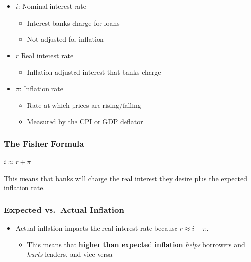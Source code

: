 \documentclass[
  letterpaper,
  DIV=11,
  numbers=noendperiod]{scrartcl}
\providecommand{\tightlist}{%
  \setlength{\itemsep}{0pt}\setlength{\parskip}{0pt}}\usepackage{longtable,booktabs,array}
\begin{document}
\begin{itemize}
\tightlist
\item
  \(i\): Nominal interest rate

  \begin{itemize}
  \tightlist
  \item
    Interest banks charge for loans
  \item
    Not adjusted for inflation
  \end{itemize}
\item
  \(r\) Real interest rate

  \begin{itemize}
  \tightlist
  \item
    Inflation-adjusted interest that banks charge
  \end{itemize}
\item
  \(\pi\): Inflation rate

  \begin{itemize}
  \tightlist
  \item
    Rate at which prices are rising/falling
  \item
    Measured by the CPI or GDP deflator
  \end{itemize}
\end{itemize}

\subsubsection{The Fisher Formula}\label{the-fisher-formula}

\(i \approx r + \pi\)

This means that banks will charge the real interest they desire plus the
expected inflation rate.

\subsubsection{Expected vs.~Actual
Inflation}\label{expected-vs.-actual-inflation}

\begin{itemize}
\tightlist
\item
  Actual inflation impacts the real interest rate because
  \(r \approx i - \pi\).

  \begin{itemize}
  \tightlist
  \item
    This means that \textbf{higher than expected inflation} \emph{helps}
    borrowers and \emph{hurts} lenders, and vice-versa
  \end{itemize}
\end{itemize}
\end{document}
